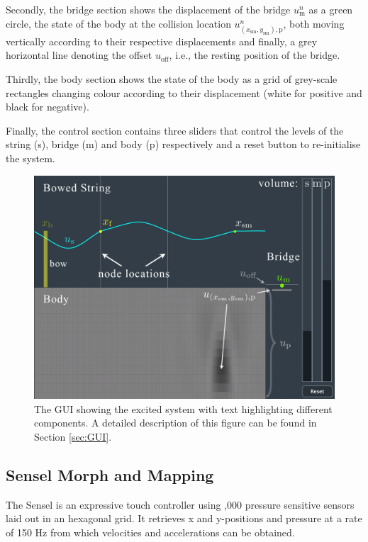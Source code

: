 \documentclass[dvipsnames, pdftex]{article}
\begin{document}
Secondly, the bridge section shows the displacement of the bridge $u_\text{m}^n$ as a green circle, the state of the body at the collision location $u_{(x_\text{sm},y_\text{sm}),\text{p}}^n$, both moving vertically according to their respective displacements and finally, a grey horizontal line denoting the offset $u_\text{off}$, i.e., the resting position of the bridge.

Thirdly, the body section shows the state of the body as a grid of grey-scale rectangles changing colour according to their displacement (white for positive and black for negative).

Finally, the control section contains three sliders that control the levels of the string (s), bridge (m) and body (p) respectively and a reset button to re-initialise the system. 
\begin{figure}[h]
  \centering
  \includegraphics[width=1.0\columnwidth]{applicationDescription.png}
  \caption{The GUI showing the excited system with text highlighting different components. A detailed description of this figure can be found in Section \ref{sec:GUI}.}
  \label{fig:GUI}
\end{figure}

\subsection{Sensel Morph and Mapping}
The Sensel is an expressive touch controller using ,000 pressure sensitive sensors laid out in an hexagonal grid\cite{sensel2020}. It retrieves x and y-positions and pressure at a rate of 150 Hz from which velocities and accelerations can be obtained.
\end{document}
